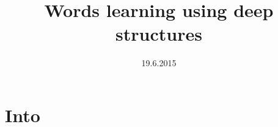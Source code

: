 \documentclass[compress,red]{beamer}
\title[Words learning using deep structures]{%
      Words learning using deep structures}
\date[19.6.2015]{19.6.2015}
\begin{document}

\begin{frame}[plain]
 \titlepage
\end{frame}


\section{Into}    %
\end{document}
